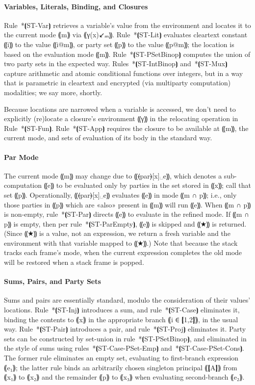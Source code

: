 \paragraph*{Variables, Literals, Binding, and Closures}

Rule~*⦗ST-Var⦘ retrieves a variable's value from the environment and
locates it to the current mode ⸨m⸩ via ⸨γ(x)↙ₘ⸩. Rule~*⦗ST-Lit⦘ evaluates
cleartext constant ⸨i⸩ to the value ⸨i@m⸩, or party set ⸨p⸩ to the value ⸨p@m⸩;
the location is based on the evaluation mode ⸨m⸩.  Rule~*⦗ST-PSetBinop⦘ computes
the union of two party sets in the expected way. Rules~*⦗ST-IntBinop⦘
and~*⦗ST-Mux⦘ capture arithmetic and atomic conditional functions over integers,
but in a way that is parametric in cleartext and encrypted (via multiparty
computation) modalities; we say more, shortly.

Because locations are narrowed when a variable is accessed, we don't need to
explicitly (re)locate a closure's environment ⸨γ⸩ in the relocating
operation in Rule~*⦗ST-Fun⦘. Rule~*⦗ST-App⦘ requires the closure to be available at ⸨m⸩,
the current mode, and sets of evaluation of its body in the standard way.

\paragraph*{Par Mode}

The current mode ⸨m⸩ may change due to ⸨⦑par⦒[x]␣e⸩, which denotes a
sub-computation ⸨e⸩ to be evaluated only by parties in the set stored
in ⸨x⸩; call that set ⸨p⸩. Operationally, ⸨⦑par⦒[x]␣e⸩ evaluates ⸨e⸩ in mode
⸨m ∩ p⸩; i.e., only those parties in ⸨p⸩ which are «also» present in ⸨m⸩ will run ⸨e⸩.
When ⸨m ∩ p⸩ is non-empty, rule~*⦗ST-Par⦘ directs ⸨e⸩ to evaluate in the refined mode.
If ⸨m ∩ p⸩ is empty, then per rule~*⦗ST-ParEmpty⦘, ⸨e⸩ is skipped and ⸨★⸩ is returned.
(Since ⸨★⸩ is a value, not an expression, we return a fresh variable and the
environment with that variable mapped to ⸨★⸩.) Note that because the stack
tracks each frame's mode, when the current expression completes the old
mode will be restored when a stack frame is popped.

\paragraph*{Sums, Pairs, and Party Sets}

Sums and pairs are essentially standard, modulo the consideration of their values' locations.
%
Rule~*⦗ST-Inj⦘ introduces a sum, and rule~*⦗ST-Case⦘ eliminates it, binding the
contents to ⸨x⸩ in the appropriate branch ⸨i ∈ ❴1,2❵⸩, in the usual way.
%
Rule~*⦗ST-Pair⦘ introduces a pair, and rule~*⦗ST-Proj⦘ eliminates it.
%
Party sets can be constructed by set-union in rule~*⦗ST-PSetBinop⦘,
and eliminated in the style of sums using rules~*⦗ST-Case-PSet-Emp⦘
and~*⦗ST-Case-PSet-Cons⦘. The former rule eliminates an empty set,
evaluating to first-branch expression ⸨e₁⸩; the latter rule binds an
arbitrarily chosen singleton principal ⸨❴A❵⸩ from ⸨x₁⸩ to ⸨x₂⸩ and the
remainder ⸨p⸩ to ⸨x₃⸩ when evaluating second-branch ⸨e₂⸩.

